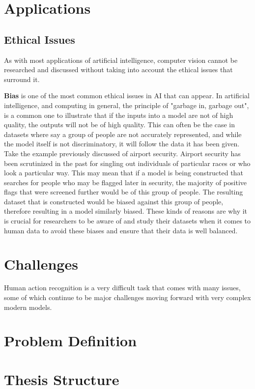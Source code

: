 \section{Applications}

\subsection{Ethical Issues}

As with most applications of artificial intelligence, computer vision cannot be researched and discussed without taking into account the ethical issues that surround it.

\textbf{Bias} is one of the most common ethical issues in AI that can appear. In artificial intelligence, and computing in general, the principle of "garbage in, garbage out", is a common one to illustrate that if the inputs into a model are not of high quality, the outputs will not be of high quality. This can often be the case in datasets where say a group of people are not accurately represented, and while the model itself is not discriminatory, it will follow the data it has been given. Take the example previously discussed of airport security. Airport security has been scrutinized in the past for singling out individuals of particular races or who look a particular way. This may mean that if a model is being constructed that searches for people who may be flagged later in security, the majority of positive flags that were screened further would be of this group of people. The resulting dataset that is constructed would be biased against this group of people, therefore resulting in a model similarly biased. These kinds of reasons are why it is crucial for researchers to be aware of and study their datasets when it comes to human data to avoid these biases and ensure that their data is well balanced.

\section{Challenges}

Human action recognition is a very difficult task that comes with many issues, some of which continue to be major challenges moving forward with very complex modern models.

\section{Problem Definition}

\section{Thesis Structure}